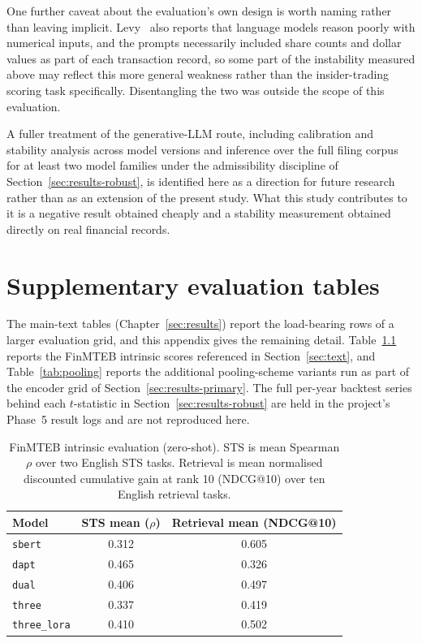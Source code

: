 \documentclass[logo,msc,ai]{infthesis}        %
\begin{document}
One further caveat about the evaluation's own design is worth naming rather than leaving implicit. Levy~\cite{bradford2026caution} also reports that language models reason poorly with numerical inputs, and the prompts necessarily included share counts and dollar values as part of each transaction record, so some part of the instability measured above may reflect this more general weakness rather than the insider-trading scoring task specifically. Disentangling the two was outside the scope of this evaluation.

A fuller treatment of the generative-LLM route, including calibration and stability analysis across model versions and inference over the full filing corpus for at least two model families under the admissibility discipline of Section~\ref{sec:results-robust}, is identified here as a direction for future research rather than as an extension of the present study. What this study contributes to it is a negative result obtained cheaply and a stability measurement obtained directly on real financial records.





\appendix

\chapter{Supplementary evaluation tables}
\label{app:eval-tables}
The main-text tables (Chapter~\ref{sec:results}) report the load-bearing rows of a larger evaluation grid, and this appendix gives the remaining detail. Table~\ref{tab:finmteb} reports the FinMTEB intrinsic scores referenced in Section~\ref{sec:text}, and Table~\ref{tab:pooling} reports the additional pooling-scheme variants run as part of the encoder grid of Section~\ref{sec:results-primary}. The full per-year backtest series behind each $t$-statistic in Section~\ref{sec:results-robust} are held in the project's Phase~5 result logs and are not reproduced here.

\begin{table}[h]
\centering
\footnotesize
\caption{FinMTEB intrinsic evaluation (zero-shot). STS is mean Spearman $\rho$ over two English STS tasks. Retrieval is mean normalised discounted cumulative gain at rank 10 (NDCG@10) over ten English retrieval tasks.}
\label{tab:finmteb}
\begin{tabular}{@{}lcc@{}}
\toprule
\textbf{Model} & \textbf{STS mean ($\rho$)} & \textbf{Retrieval mean (NDCG@10)} \\
\midrule
\texttt{sbert} & 0.312 & 0.605 \\
\texttt{dapt} & 0.465 & 0.326 \\
\texttt{dual} & 0.406 & 0.497 \\
\texttt{three} & 0.337 & 0.419 \\
\texttt{three\_lora} & 0.410 & 0.502 \\
\bottomrule
\end{tabular}
\end{table}
\end{document}
